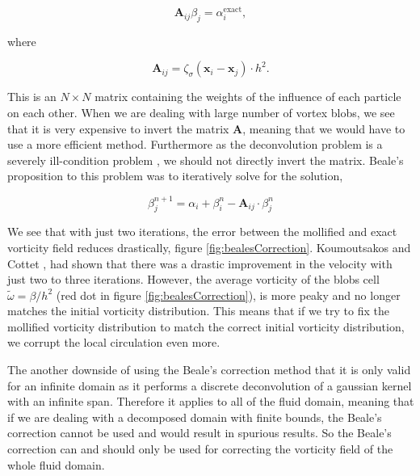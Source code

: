 	\begin{equation}
	\mathbf{A}_{ij} \beta_j = \alpha_i^{\mathrm{exact}},
	\end{equation}
	
where

	\begin{equation}
	\mathbf{A}_{ij} = \zeta_{\sigma}\left(\mathbf{x}_i - \mathbf{x}_j\right) \cdot h^2.
	\end{equation}

This is an $N \times N$ matrix containing the weights of the influence of each particle on each other. When we are dealing with large number of vortex blobs, we see that it is very expensive to invert the matrix $\mathbf{A}$, meaning that we would have to use a more efficient method. Furthermore as the deconvolution problem is a severely ill-condition problem \cite{Cottet2000a}, we should not directly invert the matrix. Beale's proposition to this problem was to iteratively solve for the solution,

	\begin{equation}
	\beta_{j}^{n+1} = \alpha_i + \beta_i^n - \mathbf{A}_{ij}\cdot\beta_j^n
	\end{equation}
	
We see that with just two iterations, the error between the mollified and exact vorticity field reduces drastically, figure \ref{fig:bealesCorrection}. Koumoutsakos and Cottet \cite{Cottet2000a}, had shown that there was a drastic improvement in the velocity with just two to three iterations. However, the average vorticity of the blobs cell $\tilde{\omega} = \beta/h^2$ (red dot in figure \ref{fig:bealesCorrection}), is more peaky and no longer matches the initial vorticity distribution. This means that if we try to fix the mollified vorticity distribution to match the correct initial vorticity distribution, we corrupt the local circulation even more.

The another downside of using the Beale's correction method that it is only valid for an infinite domain as it performs a discrete deconvolution of a gaussian kernel with an infinite span. Therefore it applies to all of the fluid domain, meaning that if we are dealing with a decomposed domain with finite bounds, the Beale's correction cannot be used and would result in spurious results. So the Beale's correction can and should only be used for correcting the vorticity field of the whole fluid domain.

